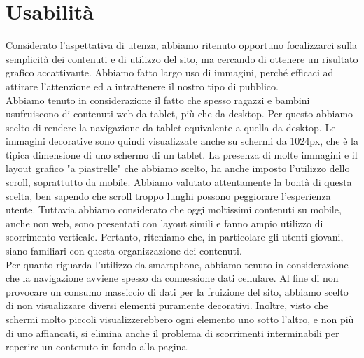 \documentclass[12pt]{article}
\begin{document}
	\section{Usabilità}
	Considerato l'aspettativa di utenza, abbiamo ritenuto opportuno focalizzarci sulla semplicità dei contenuti e di utilizzo del sito, ma cercando di ottenere un risultato grafico accattivante. Abbiamo fatto largo uso di immagini, perché efficaci ad attirare l'attenzione ed a intrattenere il nostro tipo di pubblico.\\
	Abbiamo tenuto in considerazione il fatto che spesso ragazzi e bambini usufruiscono di contenuti web da tablet, più che da desktop. Per questo abbiamo scelto di rendere la navigazione da tablet equivalente a quella da desktop. Le immagini decorative sono quindi visualizzate anche su schermi da 1024px, che è la tipica dimensione di uno schermo di un tablet.
	La presenza di molte immagini e il layout grafico "a piastrelle" che abbiamo scelto, ha anche imposto l'utilizzo dello scroll, soprattutto da mobile. Abbiamo valutato attentamente la bontà di questa scelta, ben sapendo che scroll troppo lunghi possono peggiorare l'esperienza utente. Tuttavia abbiamo considerato che oggi moltissimi contenuti su mobile, anche non web, sono presentati con layout simili e fanno ampio utilizzo di scorrimento verticale. Pertanto, riteniamo che, in particolare gli utenti giovani, siano familiari con questa organizzazione dei contenuti. \\
	Per quanto riguarda l'utilizzo da smartphone, abbiamo tenuto in considerazione che la navigazione avviene spesso da connessione dati cellulare. Al fine di non provocare un consumo massiccio di dati per la fruizione del sito, abbiamo scelto di non visualizzare diversi elementi puramente decorativi. Inoltre, visto che schermi molto piccoli visualizzerebbero ogni elemento uno sotto l'altro, e non più di uno affiancati, si elimina anche il problema di scorrimenti interminabili per reperire un contenuto in fondo alla pagina.\\
	
\end{document}
